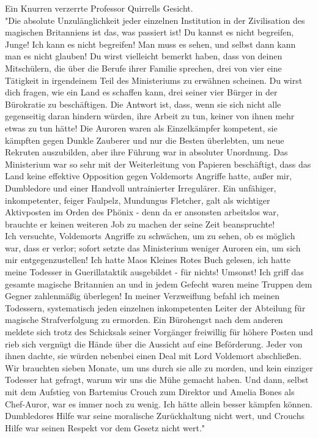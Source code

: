 {Ein Knurren verzerrte Professor Quirrells Gesicht.\\ "Die absolute Unzulänglichkeit jeder einzelnen Institution in der Zivilisation des magischen Britanniens ist das, was passiert ist! Du kannst es nicht begreifen, Junge! Ich kann es nicht begreifen! Man muss es sehen, und selbst dann kann man es nicht glauben! Du wirst vielleicht bemerkt haben, dass von deinen Mitschülern, die über die Berufe ihrer Familie sprechen, drei von vier eine Tätigkeit in irgendeinem Teil des Ministeriums zu erwähnen scheinen. Du wirst dich fragen, wie ein Land es schaffen kann, drei seiner vier Bürger in der Bürokratie zu beschäftigen. Die Antwort ist, dass, wenn sie sich nicht alle gegenseitig daran hindern würden, ihre Arbeit zu tun, keiner von ihnen mehr etwas zu tun hätte! Die Auroren waren als Einzelkämpfer kompetent, sie kämpften gegen Dunkle Zauberer und nur die Besten überlebten, um neue Rekruten auszubilden, aber ihre Führung war in absoluter Unordnung. Das Ministerium war so sehr mit der Weiterleitung von Papieren beschäftigt, dass das Land keine effektive Opposition gegen Voldemorts Angriffe hatte, außer mir, Dumbledore und einer Handvoll untrainierter Irregulärer. Ein unfähiger, inkompetenter, feiger Faulpelz, Mundungus Fletcher, galt als wichtiger Aktivposten im Orden des Phönix - denn da er ansonsten arbeitslos war, brauchte er keinen weiteren Job zu machen der seine Zeit beanspruchte!\\ Ich versuchte, Voldemorts Angriffe zu schwächen, um zu sehen, ob es möglich war, dass er verlor; sofort setzte das Ministerium weniger Auroren ein, um sich mir entgegenzustellen! Ich hatte Maos Kleines Rotes Buch gelesen, ich hatte meine Todesser in Guerillataktik ausgebildet - für nichts! Umsonst! Ich griff das gesamte magische Britannien an und in jedem Gefecht waren meine Truppen dem Gegner zahlenmäßig überlegen! In meiner Verzweiflung befahl ich meinen Todessern, systematisch jeden einzelnen inkompetenten Leiter der Abteilung für magische Strafverfolgung zu ermorden. Ein Bürohengst nach dem anderen meldete sich trotz des Schicksals seiner Vorgänger freiwillig für höhere Posten und rieb sich vergnügt die Hände über die Aussicht auf eine Beförderung. Jeder von ihnen dachte, sie würden nebenbei einen Deal mit Lord Voldemort abschließen. Wir brauchten sieben Monate, um uns durch sie alle zu morden, und kein einziger Todesser hat gefragt, warum wir uns die Mühe gemacht haben. Und dann, selbst mit dem Aufstieg von Bartemius Crouch zum Direktor und Amelia Bones als Chef-Auror, war es immer noch zu wenig. Ich hätte allein besser kämpfen können. Dumbledores Hilfe war seine moralische Zurückhaltung nicht wert, und Crouchs Hilfe war seinen Respekt vor dem Gesetz nicht wert."

}

